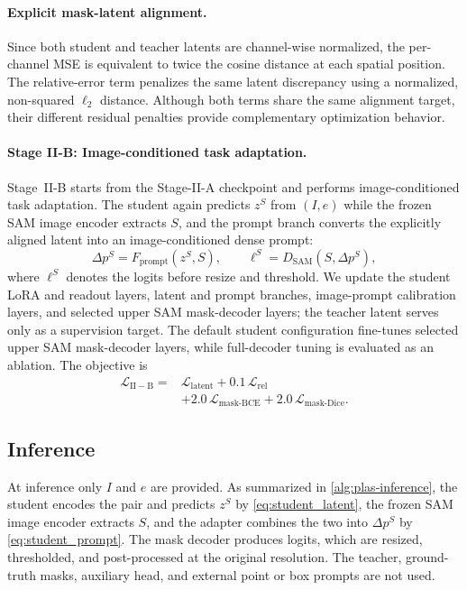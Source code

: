 \paragraph{Explicit mask-latent alignment.}
Since both student and teacher latents are
channel-wise normalized, the per-channel MSE
is equivalent to twice the cosine distance
at each spatial position.
The relative-error term penalizes the same
latent discrepancy using a normalized,
non-squared $\ell_2$ distance.
Although both terms share the same alignment
target, their different residual penalties
provide complementary optimization behavior.


\paragraph{Stage II-B: Image-conditioned task adaptation.}
\label{sec:stage2b}

Stage~II-B starts from the Stage-II-A checkpoint and performs image-conditioned task adaptation. The student again predicts $z^S$ from $(I,e)$ while the frozen SAM image encoder extracts $S$, and the prompt branch converts the explicitly aligned latent into an image-conditioned dense prompt:
\begin{equation}
  \Delta p^S=F_{\mathrm{prompt}}(z^S,S), \qquad
  \ell^S=D_{\mathrm{SAM}}(S,\Delta p^S),
  \label{eq:student_prompt}
\end{equation}
where $\ell^S$ denotes the logits before resize and threshold. We update the student LoRA and readout layers, latent and prompt branches, image-prompt calibration layers, and selected upper SAM mask-decoder layers; the teacher latent serves only as a supervision target. The default student configuration fine-tunes
selected upper SAM mask-decoder layers, while full-decoder tuning is evaluated as an ablation. The objective is
\begin{align}
  \mathcal{L}_{\mathrm{II-B}}={}&
  \mathcal{L}_{\mathrm{latent}}+0.1\,\mathcal{L}_{\mathrm{rel}} \\
  &+2.0\,\mathcal{L}_{\mathrm{mask\text{-}BCE}}
  +2.0\,\mathcal{L}_{\mathrm{mask\text{-}Dice}}.
  \label{eq:stage2b_loss}
\end{align}

\subsection{Inference}
\label{sec:inference}

At inference only $I$ and $e$ are provided. As summarized in \cref{alg:plas-inference}, the student encodes the pair and predicts $z^S$ by \cref{eq:student_latent}, the frozen SAM image encoder extracts $S$, and the adapter combines the two into $\Delta p^S$ by \cref{eq:student_prompt}. The mask decoder produces logits, which are resized, thresholded, and post-processed at the original resolution. The teacher, ground-truth masks, auxiliary head, and external point or box prompts are not used.

